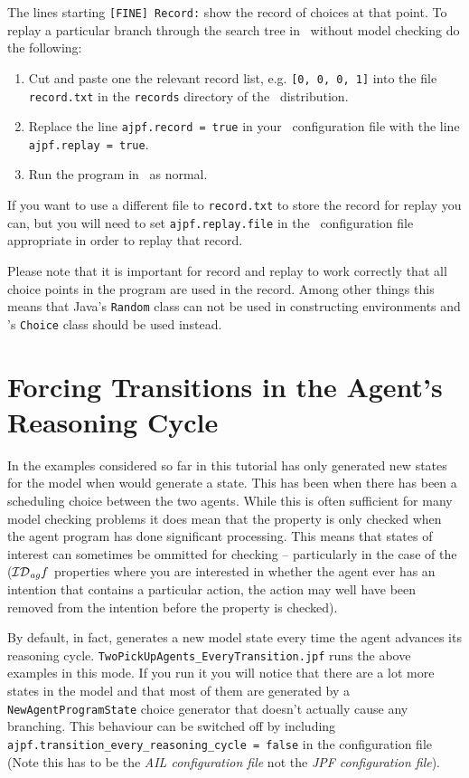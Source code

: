 The lines starting \texttt{[FINE] Record:} show the record of choices at that point.  To replay a particular branch through the search tree in \ail\ without model checking do the following:
\begin{enumerate}
\item Cut and paste one the relevant record list, e.g. \texttt{[0, 0, 0, 1]} into the file \texttt{record.txt} in the \texttt{records} directory of the \mcapl\ distribution.
\item Replace the line \texttt{ajpf.record = true} in your \ail\ configuration file with the line \texttt{ajpf.replay = true}.  
\item Run the program in \ail\ as normal.
\end{enumerate}

If you want to use a different file to \texttt{record.txt} to store the record for replay you can, but you will need to set \texttt{ajpf.replay.file} in the \ail\ configuration file appropriate in order to replay that record.

Please note that it is important for record and replay to work correctly that all choice points in the program are used in the record.  Among other things this means that Java's \texttt{Random} class can not be used in constructing environments and \ajpf's \texttt{Choice} class should be used instead.  

\section{Forcing Transitions in the Agent's Reasoning Cycle}
In the examples considered so far in this tutorial \ajpf{} has only generated new states for the model when \jpf{} would generate a state.  This has been when there has been a scheduling choice between the two agents.  While this is often sufficient for many model checking problems it does mean that the property is only checked when the agent program has done significant processing.  This means that states of interest can sometimes be ommitted for checking -- particularly in the case of the ($\mathrm{{\cal ID}}_{\mathit{ag}} f$ properties where you are interested in whether the agent ever has an intention that contains a particular action, the action may well have been removed from the intention before the property is checked).

\begin{sloppypar}
By default, in fact, \ajpf{} generates a new model state every time the agent advances its reasoning cycle.  \texttt{TwoPickUpAgents\_EveryTransition.jpf} runs the above examples in this mode.  If you run it you will notice that there are a lot more states in the model and that most of them are generated by a \texttt{NewAgentProgramState} choice generator that doesn't actually cause any branching.  This behaviour can be switched off by including \texttt{ajpf.transition\_every\_reasoning\_cycle = false} in the \ail{} configuration file (Note this has to be the \emph{AIL configuration file} not the \emph{JPF configuration file}).
\end{sloppypar}



